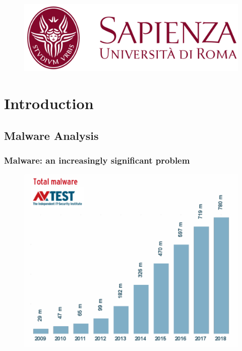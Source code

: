 \documentclass[compress]{beamer}
\begin{document}
\newcommand{\stt}{\small\tt}
\newcommand{\word}[1]{\fontsize{10.4}{10}\textsf{#1}}        %
\newcommand{\wordb}[2]{\fontsize{10.4}{10}\textsf{#1}$_#2$}        %
\newcommand{\wordc}[3]{\fontsize{10.4}{10}\textsf{#1}$_#2^#3$}        %
\newcommand{\wikipage}[1]{\textsc{#1}}        %

\newcommand\tab[1][0.5cm]{\hspace*{#1}}

\begin{frame}
 
 \begin{figure}
     \centering
    \vspace{0.5cm}
     \includegraphics[scale=.40]{image/sapienza.png}\\
    
 \end{figure}
 
\titlepage
\end{frame}

\section{Introduction}
\subsection{Malware Analysis}

\begin{frame}
    \frametitle{Malware: an increasingly significant problem }

    \begin{figure}
        \includegraphics[scale=0.55]{image/malware2}
    \end{figure}
    
\end{frame}
\end{document}
